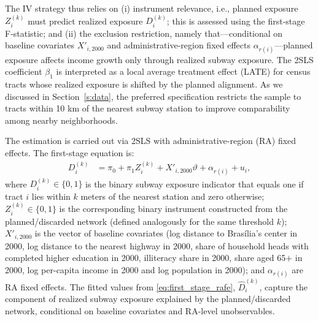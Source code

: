 The IV strategy thus relies on (i) instrument relevance, i.e., planned exposure $Z_{i}^{(k)}$ must predict realized exposure $D_{i}^{(k)}$; this is assessed using the first-stage F-statistic; and (ii) the exclusion restriction, namely that---conditional on baseline covariates $X'_{i,2000}$ and administrative-region fixed effects $\alpha_{r(i)}$---planned exposure affects income growth only through realized subway exposure. The 2SLS coefficient $\beta_{1}$ is interpreted as a local average treatment effect (LATE) for census tracts whose realized exposure is shifted by the planned alignment. As we discussed in Section~\ref{s:data}, the preferred specification restricts the sample to tracts within 10 km of the nearest subway station to improve comparability among nearby neighborhoods.

The estimation is carried out via 2SLS with administrative-region (RA) fixed effects. The first-stage equation is:
\begin{align}
    D_{i}^{(k)} &= \pi_{0} + \pi_{1}Z_{i}^{(k)} + X'_{i,2000}\vartheta + \alpha_{r(i)} + u_{i}, \label{eq:first_stage_rafe}
\end{align}
where $D_{i}^{(k)} \in \{0,1\}$ is the binary subway exposure indicator that equals one if tract $i$ lies within $k$ meters of the nearest station and zero otherwise; $Z_{i}^{(k)} \in \{0,1\}$ is the corresponding binary instrument constructed from the planned/discarded network (defined analogously for the same threshold $k$); $X'_{i,2000}$ is the vector of baseline covariates (log distance to Brasília's center in 2000, log distance to the nearest highway in 2000, share of household heads with completed higher education in 2000, illiteracy share in 2000, share aged 65$+$ in 2000, log per-capita income in 2000 and log population in 2000); and $\alpha_{r(i)}$ are RA fixed effects. The fitted values from \eqref{eq:first_stage_rafe}, $\hat{D}_{i}^{(k)}$, capture the component of realized subway exposure explained by the planned/discarded network, conditional on baseline covariates and RA-level unobservables.

